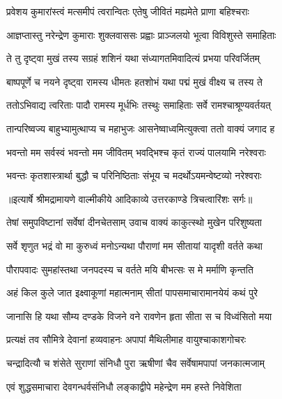 \twolineshloka
{प्रवेशय कुमारांस्त्वं मत्समीपं त्वरान्वितः}
{एतेषु जीवितं मह्यमेते प्राणा बहिश्चराः} %

\twolineshloka
{आज्ञप्तास्तु नरेन्द्रेण कुमाराः शुक्लवाससः}
{प्रह्वाः प्राञ्जलयो भूत्वा विविशुस्ते समाहिताः} %

\twolineshloka
{ते तु दृष्ट्वा मुखं तस्य सग्रहं शशिनं यथा}
{संध्यागतमिवादित्यं प्रभया परिवर्जितम्} %

\twolineshloka
{बाष्पपूर्णे च नयने दृष्ट्वा रामस्य धीमतः}
{हतशोभं यथा पद्मं मुखं वीक्ष्य च तस्य ते} %

\twolineshloka
{ततोऽभिवाद्य त्वरिताः पादौ रामस्य मूर्धभिः}
{तस्थुः समाहिताः सर्वे रामश्चाश्रूण्यवर्तयत्} %

\twolineshloka
{तान्परिष्वज्य बाहुभ्यामुत्थाप्य च महाभुजः}
{आसनेष्वाध्वमित्युक्त्वा ततो वाक्यं जगाद ह} %

\twolineshloka
{भवन्तो मम सर्वस्वं भवन्तो मम जीवितम्}
{भवद्भिश्च कृतं राज्यं पालयामि नरेश्वराः} %

\twolineshloka
{भवन्तः कृतशास्त्रार्था बुद्धौ च परिनिष्ठिताः}
{संभूय च मदर्थोऽयमन्वेष्टव्यो नरेश्वराः} %


{॥इत्यार्षे श्रीमद्रामायणे वाल्मीकीये आदिकाव्ये उत्तरकाण्डे त्रिचत्वारिंशः सर्गः॥}


\twolineshloka
{तेषां समुपविष्टानां सर्वेषां दीनचेतसाम्}
{उवाच वाक्यं काकुत्स्थो मुखेन परिशुष्यता} %

\twolineshloka
{सर्वे शृणुत भद्रं वो मा कुरुध्वं मनोऽन्यथा}
{पौराणां मम सीतायां यादृशी वर्तते कथा} %

\twolineshloka
{पौरापवादः सुमहांस्तथा जनपदस्य च}
{वर्तते मयि बीभत्सः स मे मर्माणि कृन्तति} %

\twolineshloka
{अहं किल कुले जात इक्ष्वाकूणां महात्मनाम्}
{सीतां पापसमाचारामानयेयं कथं पुरे} %

\twolineshloka
{जानासि हि यथा सौम्य दण्डके विजने वने}
{रावणेन हृता सीता स च विध्वंसितो मया} %

\twolineshloka
{प्रत्यक्षं तव सौमित्रे देवानां हव्यवाहनः}
{अपापां मैथिलीमाह वायुश्चाकाशगोचरः} %

\twolineshloka
{चन्द्रादित्यौ च शंसेते सुराणां संनिधौ पुरा}
{ऋषीणां चैव सर्वेषामपापां जनकात्मजाम्} %

\twolineshloka
{एवं शुद्धसमाचारा देवगन्धर्वसंनिधौ}
{लङ्काद्वीपे महेन्द्रेण मम हस्ते निवेशिता} %


